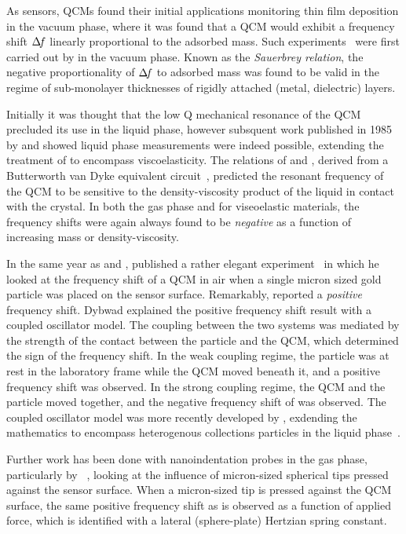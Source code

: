 As sensors, QCMs found their initial applications monitoring thin film
deposition in the vacuum phase, where it was found that a QCM would exhibit
a frequency shift $\Delta\!f$ linearly proportional to the adsorbed mass.  Such
experiments~\cite{sauerbrey1959verwendung} were first carried out by
 in the vacuum phase.  Known as the \textit{Sauerbrey
relation}, the negative proportionality of $\Delta\!f$ to adsorbed mass was found
to be valid in the regime of sub-monolayer thicknesses of rigidly attached
(metal, dielectric) layers.

Initially it was thought that the low Q mechanical resonance of the QCM
precluded its use in the liquid phase, however subsquent work published in
1985 by  and  showed liquid phase measurements
were indeed possible, extending the treatment of  to
encompass viscoelasticity.  The relations of  and
, derived from a Butterworth van Dyke equivalent
circuit~\cite{kanazawa1985frequency}, predicted the resonant frequency of
the QCM to be sensitive to the density-viscosity product of the liquid in
contact with the crystal.  In both the gas phase and for viseoelastic
materials, the frequency shifts were again always found to be
\textit{negative} as a function of increasing mass or density-viscosity.

In the same year as  and , 
published a rather elegant experiment~\cite{dybwad1985sensitive} in which
he looked at the frequency shift of a QCM in air when a single micron sized
gold particle was placed on the sensor surface.  Remarkably, 
reported a \textit{positive} frequency shift.  Dybwad explained the
positive frequency shift result with a coupled oscillator model.  The
coupling between the two systems was mediated by the strength of the
contact between the particle and the QCM, which determined the sign of the
frequency shift.  In the weak coupling regime, the particle was at rest in
the laboratory frame while the QCM moved beneath it, and a positive
frequency shift was observed.  In the strong coupling regime, the QCM and
the particle moved together, and the negative frequency shift of
 was observed.  The coupled oscillator model was more
recently developed by , exdending the mathematics to
encompass heterogenous collections particles in the liquid
phase~\cite{johannsman2007contacts}.

Further work has been done with nanoindentation probes in the gas phase,
particularly by ~\cite{borovsky2001measuring}, looking at
the influence of micron-sized spherical tips pressed against the sensor
surface.  When a micron-sized tip is pressed against the QCM surface, the
same positive frequency shift as  is observed as a function of
applied force, which is identified with a lateral (sphere-plate) Hertzian
spring constant.

